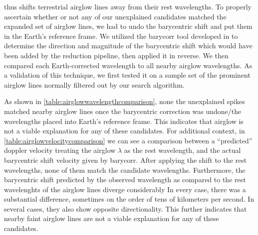 thus shifts terrestrial airglow lines away from their rest wavelengths. To properly ascertain whether or not any of our unexplained candidates matched the expanded set of airglow lines, we had to undo the barycentric shift and put them in the Earth's reference frame. We utilized the barycorr tool developed in \cite{2014PASP..126..838W} to determine the direction and magnitude of the barycentric shift which would have been added by the reduction pipeline, then applied it in reverse. We then compared each Earth-corrected wavelength to all nearby airglow wavelengths. As a validation of this technique, we first tested it on a sample set of the prominent airglow lines normally filtered out by our search algorithm. 

As shown in \ref{table:airglowwavelengthcomparison}, none the unexplained spikes matched nearby airglow lines once the barycentric correction was undone/the wavelengths placed into  Earth's reference frame. This  indicates that airglow is not a viable explanation for any of these candidates. For additional context, in \ref{table:airglowvelocitycomparison} we can see a comparison between a ``predicted'' doppler velocity treating the airglow $\lambda$ as the rest wavelength, and the actual barycentric shift velocity given by barycorr. After applying the shift to the rest wavelengths, none of them match the candidate wavelengths. Furthermore, the barycentric shift predicted by the observed wavelength as compared to the rest wavelenghts of the airglow lines diverge considerably In every case, there was a substantial difference, sometimes on the order of tens of kilometers per second. In several cases, they also show opposite directionality. This further indicates that nearby faint airglow lines are not a viable explanation for any of these candidates.

